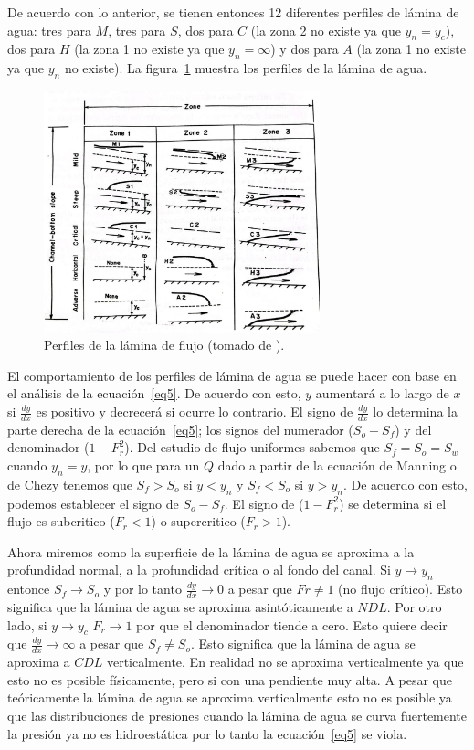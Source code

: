 \documentclass[11pt, oneside]{article}
\begin{document}
De acuerdo con lo anterior, se tienen entonces 12 diferentes perfiles de l\'amina de agua: tres para $M$, tres para $S$, dos para $C$ (la zona 2 no existe ya que $y_n = y_c$), dos para $H$ (la zona 1 no existe ya que $y_n = \infty$) y dos para $A$ (la zona 1 no existe ya que $y_n$ no existe). La figura~\ref{fig3} muestra los perfiles de la l\'amina de agua.

\begin{figure}[h]
\centering
\includegraphics[width=8cm]{fig53.jpeg}
\caption{Perfiles de la l\'amina de flujo (tomado de \cite{Chau}).}
\label{fig3}
\end{figure}
 
El comportamiento de los  perfiles de l\'amina de agua se puede hacer con base en el an\'alisis de la ecuaci\'on~\ref{eq5}. De acuerdo con esto, $y$ aumentar\'a a lo largo de $x$ si $\frac{dy}{dx}$ es positivo y decrecer\'a si ocurre lo contrario. El signo de $\frac{dy}{dx}$ lo determina la parte derecha de la ecuaci\'on~\ref{eq5}; los signos del numerador ($S_o - S_f $) y del denominador ($1-F_r^2$). Del estudio de flujo uniformes sabemos que $S_f = S_o = S_w$ cuando $y_n = y$, por lo que para un $Q$ dado a partir de la ecuaci\'on de Manning o de Chezy tenemos que $S_f > S_o$ si $y< y_n$ y $S_f < S_o$ si $y > y_n$. De acuerdo con esto, podemos establecer el signo de $S_o - S_f$. El signo de ($1-F_r^2$) se determina si el flujo es subcritico ($F_r < 1$) o supercritico ($F_r > 1$). 

Ahora miremos como la superficie de la l\'amina de agua se aproxima a la profundidad normal, a la profundidad cr\'itica o al fondo del canal. Si $y \rightarrow y_n$ entonce $S_f \rightarrow S_o$ y por lo tanto $\frac{dy}{dx} \rightarrow 0$ a pesar que $Fr \neq 1$ (no flujo cr\'itico). Esto significa que  la l\'amina de agua se aproxima asint\'oticamente a $NDL$. Por otro lado, si $y \rightarrow y_c$ $F_r \rightarrow 1$ por que el denominador tiende a cero. Esto quiere decir que $\frac{dy}{dx} \rightarrow \infty$ a pesar que $S_f \neq S_o$. Esto significa que la l\'amina de agua se aproxima a $CDL$ verticalmente. En realidad no se aproxima verticalmente ya que esto no es posible f\'isicamente, pero si con una pendiente muy alta. A pesar que te\'oricamente la l\'amina de agua se aproxima verticalmente esto no es posible ya que las distribuciones de presiones cuando la  l\'amina de agua se curva fuertemente la presi\'on ya no es hidroest\'atica por lo tanto la ecuaci\'on~\ref{eq5} se viola.  
\end{document}

